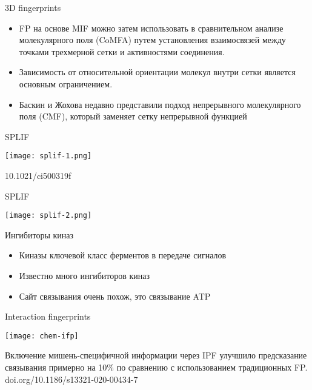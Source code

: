 \begin{frame}{3D fingerprints}
    \begin{itemize}
        \item FP на основе MIF можно затем использовать в сравнительном анализе молекулярного поля (CoMFA) путем установления взаимосвязей между точками трехмерной сетки и активностями соединения. 
        \item Зависимость от относительной ориентации молекул внутри  сетки является основным ограничением.
        \item   Баскин и Жохова недавно представили подход непрерывного молекулярного поля (CMF), который заменяет сетку непрерывной функцией
    \end{itemize}
\end{frame}


\begin{frame}{SPLIF}
    \begin{center}
        \texttt{[image: splif-1.png]}

        \footnotesize 10.1021/ci500319f
    \end{center}
\end{frame}
\begin{frame}{SPLIF}
    \begin{center}
        \texttt{[image: splif-2.png]}
    \end{center}
\end{frame}


\begin{frame}{Ингибиторы киназ}
    \begin{itemize}
        \item Киназы ключевой класс ферментов в передаче сигналов
        \item Известно много ингибиторов киназ 
        \item Сайт связывания очень похож, это связывание ATP
     \end{itemize}
    \end{frame}

\begin{frame}{Interaction fingerprints}
    \begin{center}
    \texttt{[image: chem-ifp]} 
    \end{center}
    Включение мишень-специфичной  информации через IPF улучшило предсказание  связывания примерно на 10\% по сравнению с использованием
    традиционных FP. \\
    \footnotesize doi.org/10.1186/s13321-020-00434-7
\end{frame}

